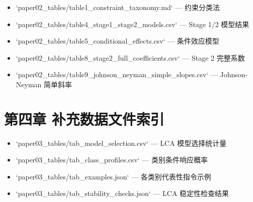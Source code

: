 \documentclass[12pt,a4paper,openany,oneside]{ctexrep}
\begin{document}
\begin{itemize}
\item `paper02\_tables/table1\_constraint\_taxonomy.md` — 约束分类法
\item `paper02\_tables/table4\_stage1\_stage2\_models.csv` — Stage 1/2 模型结果
\item `paper02\_tables/table5\_conditional\_effects.csv` — 条件效应模型
\item `paper02\_tables/table8\_stage2\_full\_coefficients.csv` — Stage 2 完整系数
\item `paper02\_tables/table9\_johnson\_neyman\_simple\_slopes.csv` — Johnson-Neyman 简单斜率
\end{itemize}


\section{第四章 补充数据文件索引}


\begin{itemize}
\item `paper03\_tables/tab\_model\_selection.csv` — LCA 模型选择统计量
\item `paper03\_tables/tab\_class\_profiles.csv` — 类别条件响应概率
\item `paper03\_tables/tab\_examples.json` — 各类别代表性指令示例
\item `paper03\_tables/tab\_stability\_checks.json` — LCA 稳定性检查结果
\end{itemize}
\end{document}
